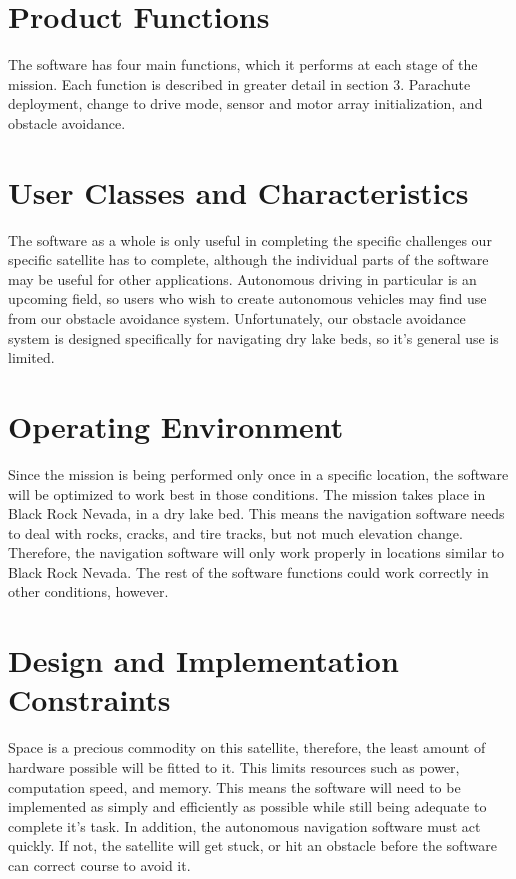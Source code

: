 \documentclass{scrreprt}
\begin{document}
\section{Product Functions}
The software has four main functions, which it performs at each stage of the mission. Each function is described in greater detail in section 3. Parachute deployment, change to drive mode, sensor and motor array initialization, and obstacle avoidance. 

\section{User Classes and Characteristics}
The software as a whole is only useful in completing the specific challenges our specific satellite has to complete, although the individual parts of the software may be useful for other applications. Autonomous driving in particular is an upcoming field, so users who wish to create autonomous vehicles may find use from our obstacle avoidance system. Unfortunately, our obstacle avoidance system is designed specifically for navigating dry lake beds, so it's general use is limited. 

\section{Operating Environment}
Since the mission is being performed only once in a specific location, the software will be optimized to work best in those conditions. The mission takes place in Black Rock Nevada, in a dry lake bed. This means the navigation software needs to deal with rocks, cracks, and tire tracks, but not much elevation change. Therefore, the navigation software will only work properly in locations similar to Black Rock Nevada. The rest of the software functions could work correctly in other conditions, however. 

\section{Design and Implementation Constraints}
Space is a precious commodity on this satellite, therefore, the least amount of hardware possible will be fitted to it. This limits resources such as power, computation speed, and memory. This means the software will need to be implemented as simply and efficiently as possible while still being adequate to complete it's task. In addition, the autonomous navigation software must act quickly. If not, the satellite will get stuck, or hit an obstacle before the software can correct course to avoid it.
\end{document}

